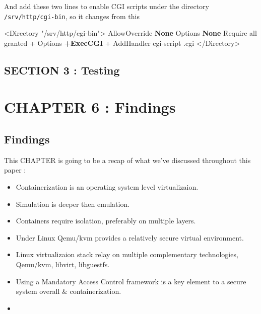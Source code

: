 \documentclass[
  14pt,
  english,
  a4paper,
]{scrreprt}
\newenvironment{Shaded}{}{}
\newcommand{\AttributeTok}[1]{\textcolor[rgb]{0.49,0.56,0.16}{#1}}
\newcommand{\CharTok}[1]{\textcolor[rgb]{0.25,0.44,0.63}{#1}}
\newcommand{\ExtensionTok}[1]{#1}
\newcommand{\FunctionTok}[1]{\textcolor[rgb]{0.02,0.16,0.49}{#1}}
\newcommand{\KeywordTok}[1]{\textcolor[rgb]{0.00,0.44,0.13}{\textbf{#1}}}
\newcommand{\NormalTok}[1]{#1}
\newcommand{\StringTok}[1]{\textcolor[rgb]{0.25,0.44,0.63}{#1}}
\providecommand{\tightlist}{%
  \setlength{\itemsep}{0pt}\setlength{\parskip}{0pt}}
\begin{document}
And add these two lines to enable CGI scripts under the directory
\texttt{/srv/http/cgi-bin}, so it changes from this

\begin{Shaded}
\begin{Highlighting}[]
\FunctionTok{\textless{}Directory}\AttributeTok{ "/srv/http/cgi{-}bin"}\FunctionTok{\textgreater{}}
    \ExtensionTok{AllowOverride}\CharTok{ }\KeywordTok{None}
    \ExtensionTok{Options}\CharTok{ }\KeywordTok{None}
\NormalTok{    Require}\StringTok{ all granted}
\NormalTok{+   }\ExtensionTok{Options}\CharTok{ }\KeywordTok{+ExecCGI}
\NormalTok{+   AddHandler}\StringTok{ cgi{-}script .cgi}
\FunctionTok{\textless{}/Directory\textgreater{}}
\end{Highlighting}
\end{Shaded}

\hypertarget{sec:test}{%
\section{SECTION 3 : Testing}\label{sec:test}}

\hypertarget{chapter-6-findings}{%
\chapter{CHAPTER 6 : Findings}\label{chapter-6-findings}}

\hypertarget{findings}{%
\section{Findings}\label{findings}}

This CHAPTER is going to be a recap of what we've discussed throughout
this paper :

\begin{itemize}
\tightlist
\item
  Containerization is an operating system level virtualizaion.
\item
  Simulation is deeper then emulation.
\item
  Containers require isolation, preferably on multiple layers.
\item
  Under Linux Qemu/kvm provides a relatively secure virtual environment.
\item
  Linux virtualizaion stack relay on multiple complementary
  technologies, Qemu/kvm, libvirt, libguestfs.
\item
  Using a Mandatory Access Control framework is a key element to a
  secure system overall \& containerization.
\item
\end{itemize}
\end{document}
